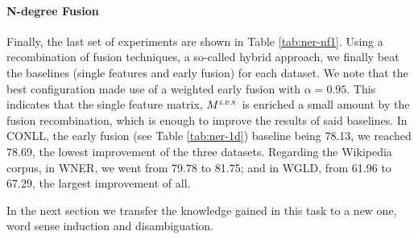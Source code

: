 \paragraph{N-degree Fusion}
Finally, the last set of experiments are shown in Table \ref{tab:ner-nf1}. Using a recombination of fusion techniques, a so-called hybrid approach, we finally beat the baselines (single features and early fusion) for each dataset. We note that the best configuration made use of a weighted early fusion with $\alpha=0.95$. This indicates that the single feature matrix, $M^{\scriptscriptstyle LEX}$ is enriched a small amount by the fusion recombination, which is enough to improve the results of said baselines. In CONLL, the early fusion (see Table \ref{tab:ner-1d}) baseline being 78.13, we reached 78.69, the lowest improvement of the three datasets. Regarding the Wikipedia corpus, in WNER, we went from 79.78 to 81.75; and in WGLD, from 61.96 to 67.29, the largest improvement of all.

In the next section we transfer the knowledge gained in this task to a new one, word sense induction and disambiguation.

